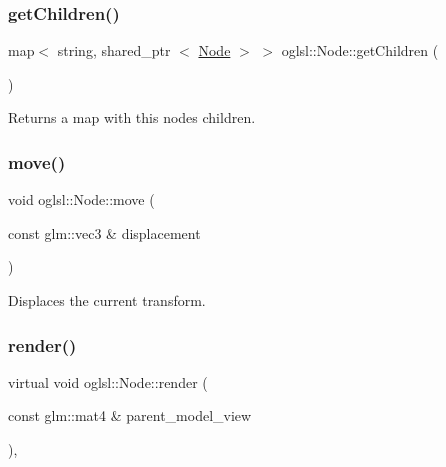 \mbox{\label{classoglsl_1_1_node_a7f3fb74d9bb97e2bc5f20ba75fbfa1e6}} 
\subsubsection{\texorpdfstring{get\+Children()}{getChildren()}}
{\footnotesize\ttfamily map$<$ string, shared\+\_\+ptr $<$ \mbox{\hyperlink{classoglsl_1_1_node}{Node}} $>$ $>$ oglsl\+::\+Node\+::get\+Children (\begin{DoxyParamCaption}{ }\end{DoxyParamCaption})\hspace{0.3cm}{\ttfamily [inline]}}



Returns a map with this node\textquotesingle{}s children. 

\mbox{\label{classoglsl_1_1_node_a69b0ce077cfafe57a573a65299440949}} 
\subsubsection{\texorpdfstring{move()}{move()}}
{\footnotesize\ttfamily void oglsl\+::\+Node\+::move (\begin{DoxyParamCaption}\item[{const glm\+::vec3 \&}]{displacement }\end{DoxyParamCaption})\hspace{0.3cm}{\ttfamily [inline]}}



Displaces the current transform. 

\mbox{\label{classoglsl_1_1_node_a09545b18a2d798327601a6251c091444}} 
\subsubsection{\texorpdfstring{render()}{render()}}
{\footnotesize\ttfamily virtual void oglsl\+::\+Node\+::render (\begin{DoxyParamCaption}\item[{const glm\+::mat4 \&}]{parent\+\_\+model\+\_\+view }\end{DoxyParamCaption})\hspace{0.3cm}{\ttfamily [inline]}, {\ttfamily [virtual]}}



